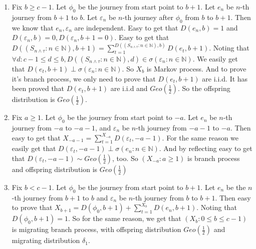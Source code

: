 \documentclass{ctexart}
\begin{document}
\begin{solution}
  \begin{enumerate}
    \item Fix \(b \geq c-1\). Let \(\phi_0\) be the journey from start point to \(b+1\).
      Let \(e_n\) be \(n\)-th journey from \(b+1\) to \(b\).
      Let \(\varepsilon_n\) be \(n\)-th journey after \(\phi_0\) from \(b\) to \(b+1\).
      Then we know that \(e_n,\varepsilon_n\) are independent.
      Easy to get that \(D(e_n,b)=1\) and \(D(\varepsilon_n,b)=0,D(\varepsilon_n,b+1=0)\).
      Easy to get that \(D((S_{n \wedge \tau}:n \in \mathbb{N}),b+1)=\sum_{t=1}^{D((S_{n \wedge \tau}:n \in \mathbb{N}),b)} D(e_t,b+1) \).
      Noting that \(\forall d:c-1 \leq d \leq b,D((S_{n \wedge \tau}:n \in \mathbb{N}),d) \in \sigma(\varepsilon_n:n \in \mathbb{N})\).
      We easily get that \(D(e_t,b+1) \perp \sigma(\varepsilon_n:n \in \mathbb{N})\).
      So \(X_b\) is Markov process. And to prove it's branch process, we only need to prove that \(D(e_t,b+1)\) are i.i.d.
      It has been proved that \(D(e_t,b+1)\) are i.i.d and \(Geo(\frac{1}{2})\).
      So the offspring distribution is \(Geo(\frac{1}{2})\).
    \item Fix \(a \geq 1\). Let \(\phi_0\) be the journey from start point to \(-a\).
      Let \(e_n\) be \(n\)-th journey from \(-a\) to \(-a-1\), and \(\varepsilon_n\) be \(n\)-th journey from \(-a-1\) to \(-a\).
      Then easy to get that \(X_{-a-1}=\sum_{t=1}^{X_{-a}} D(\varepsilon_t,-a-1)\).
      For the same reason we easily get that \(D(\varepsilon_t,-a-1)\perp \sigma(e_n:n \in \mathbb{N})\).
      And by reflecting easy to get that \(D(\varepsilon_t,-a-1) \sim Geo(\frac{1}{2})\), too.
      So \((X_{-a}:a \geq 1)\) is branch process
      and offspring distribution is \(Geo(\frac{1}{2})\)

    \item Fix \(b<c-1\). Let \(\phi_0\) be the journey from start point to \(b+1\).
      Let \(e_n\) be the \(n\)-th journey from \(b+1\) to \(b\) and \(\varepsilon_n\) be \(n\)-th journey from \(b\) to \(b+1\).
      Then easy to prove that \(X_{b+1}=D(\phi_0,b+1)+\sum_{t=1}^{X_b} D(e_n,b+1)\).
      Noting that \(D(\phi_0,b+1)=1\). So for the same reason, we get that \((X_b:0 \leq b \leq c-1)\) is migrating branch process,
      with offspring distribution \(Geo(\frac{1}{2})\) and migrating distribution \(\delta_1\).
  \end{enumerate}
\end{solution}
\begin{solution}

\end{solution}
\end{document}
